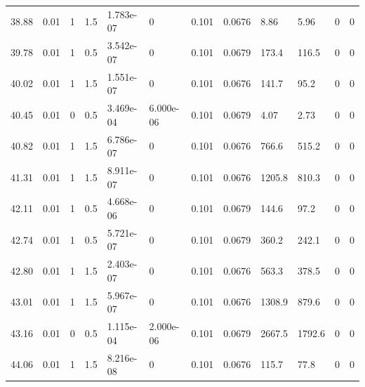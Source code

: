 \documentclass[preview]{standalone}
\begin{document}
{{{\begin{tabular}{L{1.2cm}C{1.2cm} C{0.3cm}C{0.5cm} C{1.4cm}C{1.4cm} C{1.4cm}C{1.4cm} C{1.6cm}C{1.6cm} C{1.6cm}C{1.6cm}}
  38.88  &  0.01  & 1     & 1.5 &  1.783e-07  & 0  &  0.101&   0.0676& 8.86 & 5.96   &  0 & 0  \\ 
  39.78  &  0.01  & 1     & 0.5 &  3.542e-07  & 0  &  0.101&   0.0679& 173.4 & 116.5   &  0 & 0  \\ 
  40.02  &  0.01  & 1     & 1.5 &  1.551e-07  & 0  &  0.101&   0.0676& 141.7 & 95.2   &  0 & 0  \\ 
  40.45  &  0.01  & 0     & 0.5 &  3.469e-04  & 6.000e-06  &  0.101&   0.0679& 4.07 & 2.73   &  0 & 0  \\ 
  40.82  &  0.01  & 1     & 1.5 &  6.786e-07  & 0  &  0.101&   0.0676& 766.6 & 515.2   &  0 & 0  \\ 
  41.31  &  0.01  & 1     & 1.5 &  8.911e-07  & 0  &  0.101&   0.0676& 1205.8 & 810.3   &  0 & 0  \\ 
  42.11  &  0.01  & 1     & 0.5 &  4.668e-06  & 0  &  0.101&   0.0679& 144.6 & 97.2   &  0 & 0  \\ 
  42.74  &  0.01  & 1     & 0.5 &  5.721e-07  & 0  &  0.101&   0.0679& 360.2 & 242.1   &  0 & 0  \\ 
  42.80  &  0.01  & 1     & 1.5 &  2.403e-07  & 0  &  0.101&   0.0676& 563.3 & 378.5   &  0 & 0  \\ 
  43.01  &  0.01  & 1     & 1.5 &  5.967e-07  & 0  &  0.101&   0.0676& 1308.9 & 879.6   &  0 & 0  \\ 
  43.16  &  0.01  & 0     & 0.5 &  1.115e-04  & 2.000e-06  &  0.101&   0.0679& 2667.5 & 1792.6   &  0 & 0  \\ 
  44.06  &  0.01  & 1     & 1.5 &  8.216e-08  & 0  &  0.101&   0.0676& 115.7 & 77.8   &  0 & 0  \\ 
\hline 
\end{tabular} 

}}}
\end{document}
